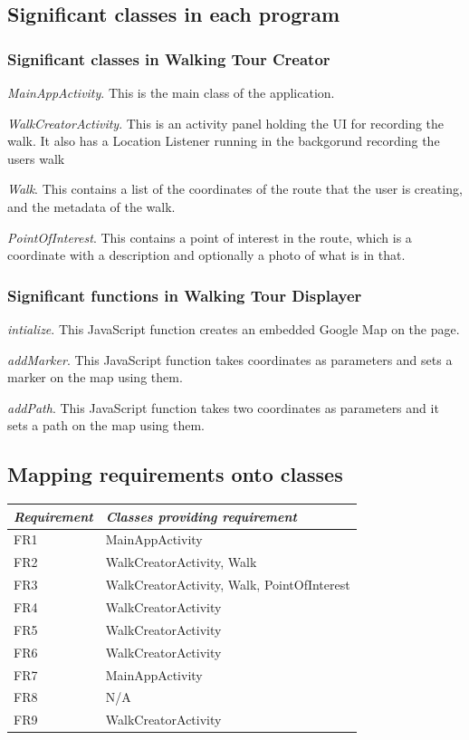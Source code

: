 \documentclass{project}
\begin{document}
\newpage

\subsection{Significant classes in each program}
\subsubsection{Significant classes in Walking Tour Creator}
\emph{MainAppActivity}. This is the main class of the application.

\emph{WalkCreatorActivity}. This is an activity panel holding the UI for
recording the walk. It also has a Location Listener running in the backgorund recording the users walk

\emph{Walk}. This contains a list of the coordinates of the route that the user
is creating, and the metadata of the walk.

\emph{PointOfInterest}. This contains a point of interest in the route, which
is a coordinate with a description and optionally a photo of what is in that.

\subsubsection{Significant functions in Walking Tour Displayer}
\emph{intialize}. This JavaScript function creates an embedded Google Map on
the page.

\emph{addMarker}. This JavaScript function takes coordinates as parameters and
sets a marker on the map using them.

\emph{addPath}. This JavaScript function takes two coordinates as parameters
and it sets a path on the map using them.


\subsection{Mapping requirements onto classes}
\begin{tabular}{|l |l |}
\hline
\emph{Requirement} & \emph{Classes providing requirement} \\
\hline
FR1 & MainAppActivity \\
\hline
FR2 & WalkCreatorActivity, Walk \\
\hline
FR3 & WalkCreatorActivity, Walk, PointOfInterest  \\
\hline
FR4 & WalkCreatorActivity \\
\hline
FR5 & WalkCreatorActivity \\
\hline
FR6 & WalkCreatorActivity \\
\hline
FR7 & MainAppActivity \\
\hline
FR8 & N/A \\
\hline
FR9 & WalkCreatorActivity \\
\hline
\end{tabular}
\end{document}
